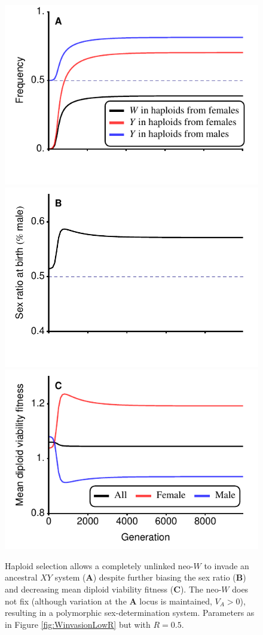 \documentclass[12pt]{article}
\begin{document}
\begin{figure}
\centering
\includegraphics[width=0.5\linewidth]{FreqWHighR}\\
\includegraphics[width=0.5\linewidth]{SexRatioHighR}\\
\includegraphics[width=0.5\linewidth]{MeanDipFitHighR}
\caption{
Haploid selection allows a completely unlinked neo-$W$ to invade an ancestral $XY$ system (\textbf{A}) despite further biasing the sex ratio (\textbf{B}) and decreasing mean diploid viability fitness (\textbf{C}).
The neo-$W$ does not fix (although variation at the \textbf{A} locus is maintained, $V_A>0$), resulting in a polymorphic sex-determination system.
Parameters as in Figure \ref{fig:WinvasionLowR} but with $R=0.5$.
}
\label{fig:WinvasionHighR}
\end{figure}

\end{document}
